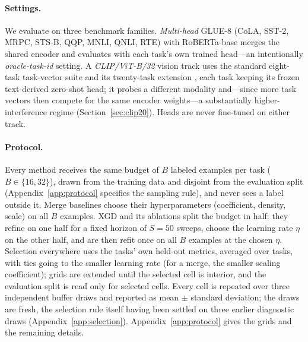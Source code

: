 \documentclass{article} %
\begin{document}
\paragraph{Settings.}
We evaluate on three benchmark families. \emph{Multi-head} GLUE-8 (CoLA, SST-2, MRPC, STS-B, QQP, MNLI, QNLI, RTE) \citep{wang2018glue} with RoBERTa-base \citep{liu2019roberta} merges the shared encoder and evaluates with each task's own trained head---an intentionally \emph{oracle-task-id} setting. A \emph{CLIP/ViT-B/32} vision track uses the standard eight-task task-vector suite \citep{radford2021clip,ilharco2022taskarithmetic} and its twenty-task extension \citep{wang2024tall}, each task keeping its frozen text-derived zero-shot head; it probes a different modality and---since more task vectors then compete for the same encoder weights---a substantially higher-interference regime (Section~\ref{sec:clip20}). Heads are never fine-tuned on either track.

\paragraph{Protocol.}
Every method receives the same budget of $B$ labeled examples per task ($B\in\{16,32\}$), drawn from the training data and disjoint from the evaluation split (Appendix~\ref{app:protocol} specifies the sampling rule), and never sees a label outside it. Merge baselines choose their hyperparameters (coefficient, density, scale) on all $B$ examples. XGD and its ablations split the budget in half: they refine on one half for a fixed horizon of $S=50$ sweeps, choose the learning rate $\eta$ on the other half, and are then refit once on all $B$ examples at the chosen $\eta$. Selection everywhere uses the tasks' own held-out metrics, averaged over tasks, with ties going to the smaller learning rate (for a merge, the smaller scaling coefficient); grids are extended until the selected cell is interior, and the evaluation split is read only for selected cells. Every cell is repeated over three independent buffer draws and reported as mean $\pm$ standard deviation; the draws are fresh, the selection rule itself having been settled on three earlier diagnostic draws (Appendix~\ref{app:selection}). Appendix~\ref{app:protocol} gives the grids and the remaining details.
\end{document}
